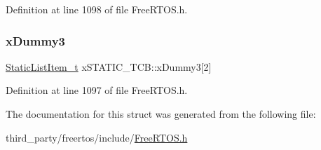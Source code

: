 Definition at line 1098 of file Free\+R\+T\+O\+S.\+h.

\mbox{\label{structxSTATIC__TCB_a7f182aa8f5003494f63d975dabcb3ec1}} 
\subsubsection{\texorpdfstring{x\+Dummy3}{xDummy3}}
{\footnotesize\ttfamily \hyperlink{FreeRTOS_8h_a1d31bc0472385a87424518da484d9e09}{Static\+List\+Item\+\_\+t} x\+S\+T\+A\+T\+I\+C\+\_\+\+T\+C\+B\+::x\+Dummy3\mbox{[}2\mbox{]}}



Definition at line 1097 of file Free\+R\+T\+O\+S.\+h.



The documentation for this struct was generated from the following file\+:\begin{DoxyCompactItemize}
\item 
third\+\_\+party/freertos/include/\hyperlink{FreeRTOS_8h}{Free\+R\+T\+O\+S.\+h}\end{DoxyCompactItemize}
